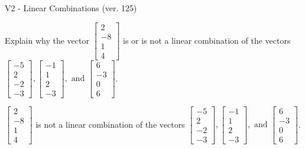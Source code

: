 \begin{exercise}
  \begin{exerciseTitle}V2 - Linear Combinations (ver. 125)\end{exerciseTitle}
  \begin{exerciseStatement}
    Explain why the vector \(\left[\begin{array}{c}
2 \\
-8 \\
1 \\
4
\end{array}\right]\)  is or is not a linear 
	combination of the vectors \(\left[\begin{array}{c}
-5 \\
2 \\
-2 \\
-3
\end{array}\right] , \left[\begin{array}{c}
-1 \\
1 \\
2 \\
-3
\end{array}\right] , \text{ and } \left[\begin{array}{c}
6 \\
-3 \\
0 \\
6
\end{array}\right]\).
	


  \end{exerciseStatement}
  \begin{exerciseAnswer}
   \(\left[\begin{array}{c}
2 \\
-8 \\
1 \\
4
\end{array}\right]\) 
  	 is not  
	a linear combination of the vectors \(\left[\begin{array}{c}
-5 \\
2 \\
-2 \\
-3
\end{array}\right] , \left[\begin{array}{c}
-1 \\
1 \\
2 \\
-3
\end{array}\right] , \text{ and } \left[\begin{array}{c}
6 \\
-3 \\
0 \\
6
\end{array}\right]\).

	
  


  \end{exerciseAnswer}
\end{exercise}